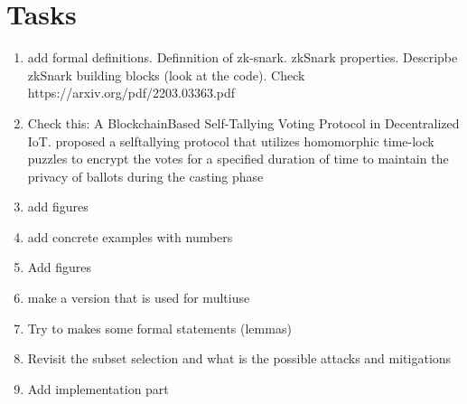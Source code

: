 \documentclass[]{paper}
\begin{document}
\section{Tasks}
\begin{enumerate}
	\item add formal definitions. Definnition of zk-snark. zkSnark properties. Descripbe zkSnark building blocks (look at the code). Check https://arxiv.org/pdf/2203.03363.pdf
	\item Check this: A BlockchainBased Self-Tallying Voting Protocol in Decentralized IoT. proposed a selftallying protocol that utilizes homomorphic time-lock puzzles to encrypt the
	votes for a specified duration of time to maintain the privacy of ballots during
	the casting phase
	\item add figures
	\item add concrete examples with numbers
	\item Add figures
	\item make a version that is used for multiuse
	\item Try to makes some formal statements (lemmas)
	\item Revisit the subset selection and what is the possible attacks and mitigations
	\item Add implementation part
\end{enumerate}
\end{document}
